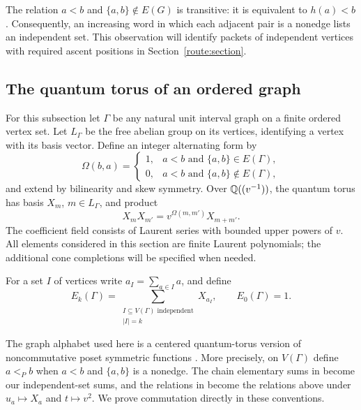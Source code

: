 The relation $a<b$ and $\{a,b\}\notin E(G)$ is transitive: it is
equivalent to $h(a)<b$. Consequently, an increasing word in which each
adjacent pair is a nonedge lists an independent set. This observation
will identify packets of independent vertices with required ascent
positions in Section~\ref{route:section}.

\subsection{The quantum torus of an ordered graph}

For this subsection let $\Gamma$ be any natural unit interval graph on
a finite ordered vertex set. Let $L_\Gamma$ be the free abelian group
on its vertices, identifying a vertex with its basis vector. Define an
integer alternating form by
\begin{equation}
 \Omega(b,a)=
 \begin{cases}1,&a<b\text{ and }\{a,b\}\in E(\Gamma),\\
                0,&a<b\text{ and }\{a,b\}\notin E(\Gamma),
 \end{cases}
 \label{graph:form}
\end{equation}
and extend by bilinearity and skew symmetry. Over
$\mathbb Q((v^{-1}))$, the quantum torus has basis $X_m$, $m\in L_\Gamma$,
and product
\begin{equation}
 X_mX_{m'}=v^{\Omega(m,m')}X_{m+m'}.
 \label{graph:torus}
\end{equation}
The coefficient field consists of Laurent series with bounded upper
powers of $v$. All elements considered in this section are finite
Laurent polynomials; the additional cone completions will be specified
when needed.

For a set $I$ of vertices write $a_I=\sum_{a\in I}a$, and define
\begin{equation}
 E_k(\Gamma)=\sum_{\substack{I\subseteq V(\Gamma)\text{ independent}\\|I|=k}}
 X_{a_I},\qquad E_0(\Gamma)=1.
 \label{graph:elementaries}
\end{equation}

The graph alphabet used here is a centered quantum-torus version of
noncommutative poset symmetric functions \cite{Hwa24,BEPS25}.  More
precisely, on $V(\Gamma)$ define $a<_P b$ when $a<b$ and $\{a,b\}$ is a nonedge.
The chain elementary sums in \cite[Equation~(2.4)]{BEPS25} become our
independent-set sums, and the relations in
\cite[Definition~3.16]{BEPS25} become the relations above under
$u_a\mapsto X_a$ and $t\mapsto v^2$.  We prove commutation directly
in these conventions.

